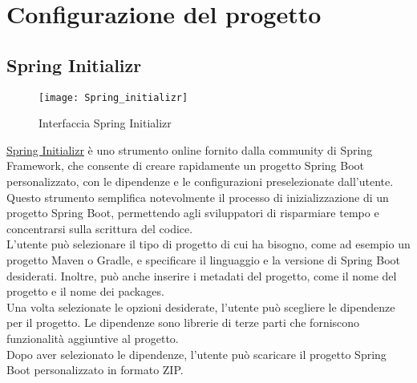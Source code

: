 \section{Configurazione del progetto}
\subsection{Spring Initializr}

\begin{figure}[!h] 
    \centering 
    \texttt{[image: Spring\_initializr]} 
    \caption{Interfaccia Spring Initializr}
\end{figure}

\noindent \href{https://start.spring.io/}{Spring Initializr} è uno strumento online fornito dalla community di Spring Framework, che consente di creare rapidamente un progetto Spring Boot personalizzato, con le dipendenze e le configurazioni preselezionate dall'utente. Questo strumento semplifica notevolmente il processo di inizializzazione di un progetto Spring Boot, permettendo agli sviluppatori di risparmiare tempo e concentrarsi sulla scrittura del codice.\\
L'utente può selezionare il tipo di progetto di cui ha bisogno, come ad esempio un progetto Maven o Gradle, e specificare il linguaggio e la versione di Spring Boot desiderati. Inoltre, può anche inserire i metadati del progetto, come il nome del progetto e il nome dei packages.\\
Una volta selezionate le opzioni desiderate, l'utente può scegliere le dipendenze per il progetto. Le dipendenze sono librerie di terze parti che forniscono funzionalità aggiuntive al progetto.\\
Dopo aver selezionato le dipendenze, l'utente può scaricare il progetto Spring Boot personalizzato in formato ZIP. 


